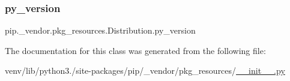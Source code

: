 \subsubsection{\texorpdfstring{py\+\_\+version}{py\_version}}
{\footnotesize\ttfamily pip.\+\_\+vendor.\+pkg\+\_\+resources.\+Distribution.\+py\+\_\+version}



The documentation for this class was generated from the following file\+:\begin{DoxyCompactItemize}
\item 
venv/lib/python3./site-\/packages/pip/\+\_\+vendor/pkg\+\_\+resources/\hyperlink{venv_2lib_2python3_89_2site-packages_2pip_2__vendor_2pkg__resources_2____init_____8py}{\+\_\+\+\_\+init\+\_\+\+\_\+.\+py}\end{DoxyCompactItemize}
